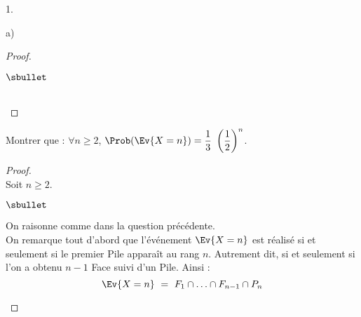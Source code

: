 \documentclass[11pt]{article}%
\begin{document}
\begin{noliste}{1.}
\begin{noliste}{a)}
\begin{proof}
\begin{noliste}{$\sbullet$}
    \end{noliste}
      ~\\[-1.4cm]
    \end{proof}
    



  \item Montrer que : $\forall n \geq 2$, $\Prob(\Ev{X = n}) =
    \dfrac{1}{3} \ \left( \dfrac{1}{2} \right)^n$.

    \begin{proof}~\\%
      Soit $n \geq 2$.
      \begin{noliste}{$\sbullet$}
      \item On raisonne comme dans la question précédente.\\
        On remarque tout d'abord que l'événement $\Ev{X = n}$ est
        réalisé si et seulement si le premier Pile apparaît au rang
        $n$. Autrement dit, si et seulement si l'on a obtenu $n-1$
        Face suivi d'un Pile. Ainsi :
        \[
        \Ev{X = n} \ = \ F_1 \cap \ldots \cap F_{n-1} \cap P_n
        \]


\end{noliste}
\end{proof}
\end{noliste}
\end{noliste}
\end{document}

